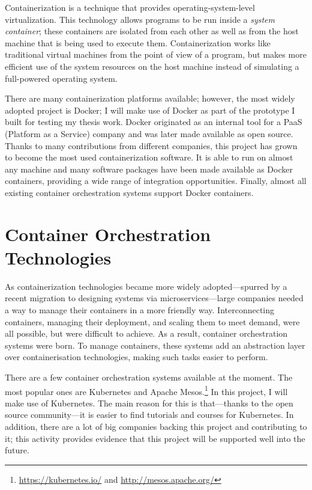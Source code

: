 Containerization is a technique that provides operating-system-level virtualization. This technology allows programs to be run inside a \textit{system container}; these containers are isolated from each other as well as from the host machine that is being used to execute them. Containerization works like traditional virtual machines from the point of view of a program, but makes more efficient use of the  system resources on the host machine instead of simulating a full-powered operating system.

There are many containerization platforms available; however, the most widely adopted project is Docker; I will make use of Docker as part of the prototype I built for testing my thesis work. Docker originated as an internal tool for a PaaS (Platform as a Service) company and was later made available as open source. Thanks to many contributions from different companies, this project has grown to become the most used containerization software. It is able to run on almost any machine and many software packages have been made available as Docker containers, providing a wide range of integration opportunities. Finally, almost all existing container orchestration systems support Docker containers.

\section{Container Orchestration Technologies}

As containerization technologies became more widely adopted---spurred by a recent migration to designing systems via microservices---large companies needed a way to manage their containers in a more friendly way. Interconnecting containers, managing their deployment, and scaling them to meet demand, were all possible, but were difficult to achieve. As a result, container orchestration systems were born. To manage containers, these systems add an abstraction layer over containerisation technologies, making such tasks easier to perform.

There are a few container orchestration systems available at the moment. The most popular ones are Kubernetes and Apache Mesos.\footnote{\href{https://kubernetes.io/}{https://kubernetes.io/} and \href{http://mesos.apache.org/}{http://mesos.apache.org/}} In this project, I will make use of Kubernetes. The main reason for this is that---thanks to the open source community---it is easier to find tutorials and courses for Kubernetes. In addition, there are a lot of big companies backing this project and contributing to it; this activity provides evidence that this project will be supported well into the future.

